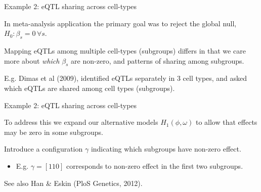 \documentclass[ignorenonframetext]{beamer}
\begin{document}
\begin{frame}{Example 2: eQTL sharing across cell-types}
 
 In meta-analysis application the primary goal was to reject the global null, $H_0: \beta_s =0 \, \forall s$.
 
 \bigskip
 
 Mapping eQTLs among multiple cell-types (subgroups) differs 
 in that we care more about {\it which} $\beta_s$ are non-zero, and patterns
 of sharing among subgroups.
 
 \bigskip
  
E.g. Dimas et al (2009), identified eQTLs separately in 3 cell types, and asked which eQTLs are shared among cell types (subgroups).
 
 
 \end{frame}
 
 \begin{frame}{Example 2: eQTL sharing across cell-types}
 
 To address this we expand our alternative models  $H_1(\phi,\omega)$ to
 allow that effects may be zero in some subgroups.

\bigskip

Introduce a \alert{configuration} $\gamma$ indicating which subgroups have non-zero effect.
\begin{itemize}
\item E.g. $\gamma=[110]$ corresponds to non-zero effect in the first two subgroups.
\end{itemize}

\bigskip

See also Han \& Eskin (PloS Genetics, 2012).


\end{frame}
\end{document}
